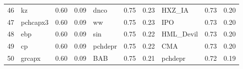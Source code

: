 \documentclass[12pt]{article}
\begin{document}
\begin{landscape}
\begin{footnotesize}
\begin{longtable}{l|lcc|lcc|lcc}
			46                    & kz                          & 0.60                                                                                 & 0.09                            & dnco                        & 0.75                                                                                 & 0.23                            & HXZ\_IA                     & 0.73                                                                                 & 0.20                           \\
			47                    & pchcapx3                    & 0.60                                                                                 & 0.09                            & ww                          & 0.75                                                                                 & 0.23                            & IPO                         & 0.73                                                                                 & 0.20                           \\
			48                    & ebp                         & 0.60                                                                                 & 0.09                            & sin                         & 0.75                                                                                 & 0.22                            & HML\_Devil                  & 0.73                                                                                 & 0.20                           \\
			49                    & cp                          & 0.60                                                                                 & 0.09                            & pchdepr                     & 0.75                                                                                 & 0.22                            & CMA                         & 0.73                                                                                 & 0.20                           \\
			50                    & grcapx                      & 0.60                                                                                 & 0.09                            & BAB                         & 0.75                                                                                 & 0.21                            & pchdepr                     & 0.72                                                                                 & 0.19                           \\

\end{longtable}
\end{footnotesize}
\end{landscape}
\end{document}
